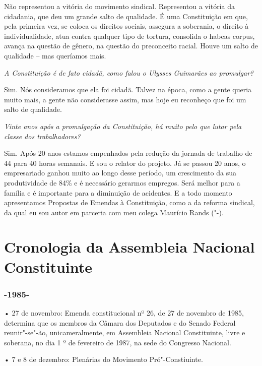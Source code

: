 Não representou a vitória do movimento sindical.
Representou a vitória da cidadania, que deu um grande salto de
qualidade. É uma Constituição em que, pela primeira vez, se coloca os
direitos sociais, assegura a soberania, o direito à individualidade,
atua contra qualquer tipo de tortura, consolida o habeas corpus, avança
na questão de gênero, na questão do preconceito racial. Houve um salto
de qualidade -- mas queríamos mais.

\medskip

\noindent\emph{A Constituição é de fato cidadã, como falou o Ulysses Guimarães
ao promulgar?}

Sim. Nós consideramos que ela foi cidadã. Talvez na
época, como a gente queria muito mais, a gente não considerasse assim,
mas hoje eu reconheço que foi um salto de qualidade.

\medskip

\noindent\emph{Vinte anos após a promulgação da Constituição, há muito pelo que
lutar pela classe dos trabalhadores?}

Sim. Após 20 anos estamos empenhados pela redução
da jornada de trabalho de 44 para 40 horas semanais. E sou o relator do
projeto. Já se passou 20 anos, o empresariado ganhou muito ao longo
desse período, um crescimento da sua produtividade de 84\% e é
necessário gerarmos empregos. Será melhor para a família e é importante
para a diminuição de acidentes. E a todo momento apresentamos Propostas
de Emendas à Constituição, como a  da reforma sindical, da qual eu
sou autor em parceria com meu colega Maurício Rands ("-).

\chapter{Cronologia da Assembleia Nacional Constituinte}

\subsection{-1985-}

\forceindent{}• 27 de novembro: Emenda constitucional nº 26, de 27 de novembro de
1985, determina que os membros da Câmara dos Deputados e do Senado
Federal reunir"-se"-ão, unicameralmente, em Assembleia Nacional
Constituinte, livre e soberana, no dia 1 º de fevereiro de 1987, na sede
do Congresso Nacional.

• 7 e 8 de dezembro: Plenárias do Movimento Pró"-Constiuinte.

